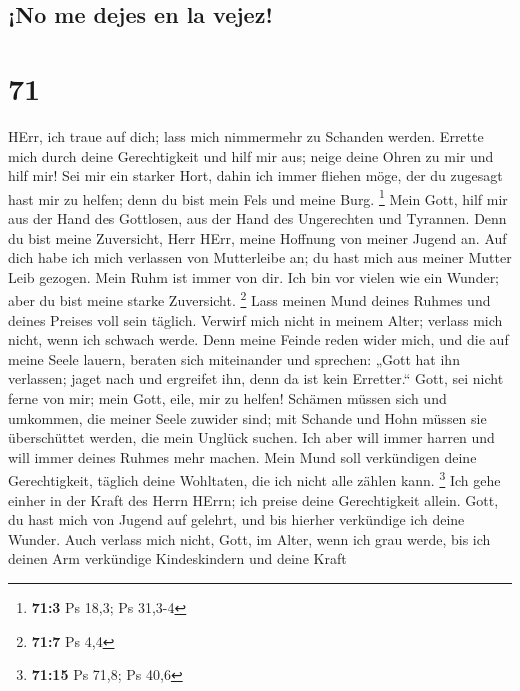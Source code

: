 \hypertarget{no-me-dejes-en-la-vejez}{%
\subsection{¡No me dejes en la vejez!}\label{no-me-dejes-en-la-vejez}}

\hypertarget{section-70}{%
\section{71}\label{section-70}}

 HErr, ich traue auf dich; lass mich nimmermehr zu
Schanden werden.  Errette mich durch deine Gerechtigkeit
und hilf mir aus; neige deine Ohren zu mir und hilf mir! 
Sei mir ein starker Hort, dahin ich immer fliehen möge, der du zugesagt
hast mir zu helfen; denn du bist mein Fels und meine Burg. \footnote{\textbf{71:3}
  Ps 18,3; Ps 31,3-4}  Mein Gott, hilf mir aus der Hand
des Gottlosen, aus der Hand des Ungerechten und Tyrannen. 
Denn du bist meine Zuversicht, Herr HErr, meine Hoffnung von meiner
Jugend an.  Auf dich habe ich mich verlassen von
Mutterleibe an; du hast mich aus meiner Mutter Leib gezogen. Mein Ruhm
ist immer von dir.  Ich bin vor vielen wie ein Wunder;
aber du bist meine starke Zuversicht. \footnote{\textbf{71:7} Ps 4,4}
 Lass meinen Mund deines Ruhmes und deines Preises voll
sein täglich.  Verwirf mich nicht in meinem Alter; verlass
mich nicht, wenn ich schwach werde.  Denn meine Feinde
reden wider mich, und die auf meine Seele lauern, beraten sich
miteinander  und sprechen: „Gott hat ihn verlassen; jaget
nach und ergreifet ihn, denn da ist kein Erretter.`` 
Gott, sei nicht ferne von mir; mein Gott, eile, mir zu helfen!
 Schämen müssen sich und umkommen, die meiner Seele
zuwider sind; mit Schande und Hohn müssen sie überschüttet werden, die
mein Unglück suchen.  Ich aber will immer harren und will
immer deines Ruhmes mehr machen.  Mein Mund soll
verkündigen deine Gerechtigkeit, täglich deine Wohltaten, die ich nicht
alle zählen kann. \footnote{\textbf{71:15} Ps 71,8; Ps 40,6}
 Ich gehe einher in der Kraft des Herrn HErrn; ich preise
deine Gerechtigkeit allein.  Gott, du hast mich von
Jugend auf gelehrt, und bis hierher verkündige ich deine Wunder.
 Auch verlass mich nicht, Gott, im Alter, wenn ich grau
werde, bis ich deinen Arm verkündige Kindeskindern und deine Kraft
